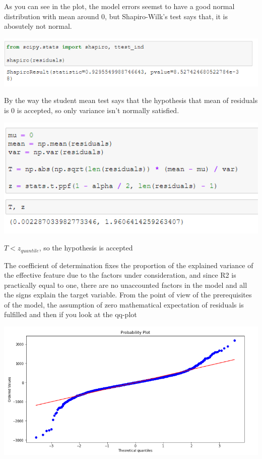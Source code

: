 \documentclass[%
12pt, %
final, %
oneside, %
onecolumn, %
centertags]{article} %
\theoremstyle{plain}
\theoremstyle{definition}
\theoremstyle{remark}
\begin{document}
As you can see in the plot, the model errors seemst to have a good normal distribution with mean around $0$, but Shapiro-Wilk's test says that, it is abosutely not normal. 

\begin{center}
\includegraphics[scale=0.55]{images/shapiro.png}
\end{center}

By the way the student mean test says that the hypothesis that mean of residuals is $0$ is accepted, so only variance isn't normally satisfied.

\begin{center}
\includegraphics[scale=0.55]{images/t.png}

$T < z_{quantile}$, so the hypothesis is accepted
\end{center}

The coefficient of determination fixes the proportion of the explained variance of the effective feature due to the factors under consideration, and since R2 is practically equal to one, there are no unaccounted factors in the model and all the signs explain the target variable. 
From the point of view of the prerequisites of the model, the assumption of zero mathematical expectation of residuals is fulfilled and then if you look at the qq-plot 

\begin{center}
\includegraphics[scale=0.65]{images/qqplot.png}
\end{center}
 
\end{document}
